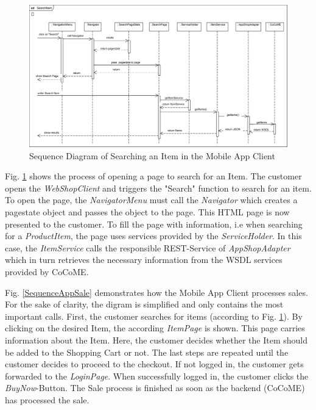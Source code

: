\begin{figure}[!h]
	\includegraphics[width=\textwidth]{img/appSearchSequence.png}
	\caption{Sequence Diagram of Searching an Item in the Mobile App Client}
	\label{SequenceAppSearch}
\end{figure}
\noindent
Fig. \ref{SequenceAppSearch} shows the process of opening a page to search for an Item. The customer opens the \textit{WebShopClient} and triggers the "Search" function to search for an item. To open the page, the \textit{NavigatorMenu} must call the \textit{Navigator} which creates a pagestate object and passes the object to the page. This HTML page is now presented to the customer. To fill the page with information, i.e when searching for a \textit{ProductItem}, the page uses services provided by the \textit{ServiceHolder}. In this case, the \textit{ItemService} calls the responsible REST-Service of \textit{AppShopAdapter} which in turn retrieves the necessary information from the WSDL services provided by CoCoME.

\noindent
Fig. \ref{SequenceAppSale} demonstrates how the Mobile App Client processes sales.  For the sake of clarity, the digram is simplified and only contains the most important calls. First, the customer searches for items (according to Fig. \ref{SequenceAppSearch}). By clicking on the desired Item, the according \textit{ItemPage} is shown. This page carries information about the Item. Here, the customer decides whether the Item should be added to the Shopping Cart or not. The last steps are repeated until the customer decides to proceed to the checkout. If not logged in, the customer gets forwarded to the \textit{LoginPage}. When successfully logged in, the customer clicks the \textit{BuyNow}-Button. The Sale process is finished as soon as the backend (CoCoME) has processed the sale.




